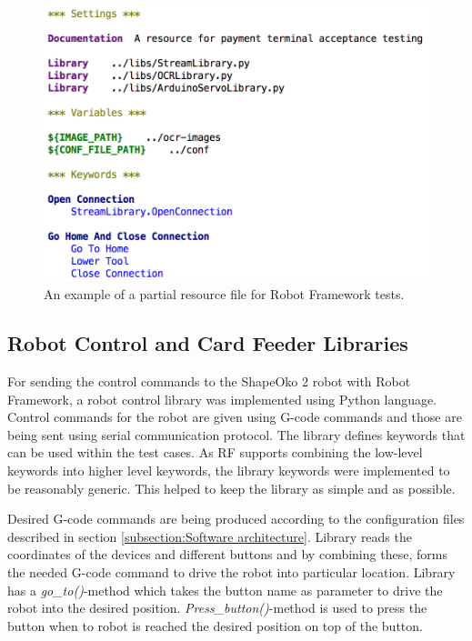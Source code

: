 \begin{figure}[ht]
  \begin{center}
    \includegraphics[width=\textwidth]{images/resource.png}
    \caption{An example of a partial resource file for Robot Framework tests.}
    \label{fig:resource}
  \end{center}
\end{figure}
\FloatBarrier

\subsection{Robot Control and Card Feeder Libraries}
\label{subsection:libraries}

For sending the control commands to the ShapeOko 2 robot with Robot Framework, a robot control library was implemented using Python language. Control commands for the robot are given using G-code commands and those are being sent using serial communication protocol. The library defines keywords that can be used within the test cases. As RF supports combining the low-level keywords into higher level keywords, the library keywords were implemented to be reasonably generic. This helped to keep the library as simple and as possible.

Desired G-code commands are being produced according to the configuration files described in section \ref{subsection:Software architecture}. Library reads the coordinates of the devices and different buttons and by combining these, forms the needed G-code command to drive the robot into particular location. Library has a \emph{go\_to()}-method which takes the button name as parameter to drive the robot into the desired position. \emph{Press\_button()}-method is used to press the button when to robot is reached the desired position on top of the button.

